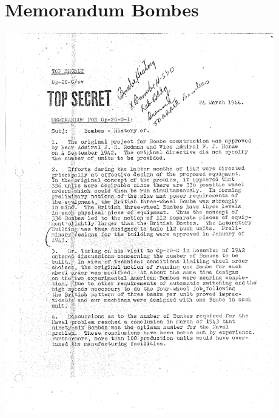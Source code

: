 \documentclass[%
<<<<<<< Updated upstream
11pt,%
twoside,%
titlepage,%
german,%
headsepline%
]{scrartcl}
\begin{document}
\clearpage

\appendix

\section{Memorandum Bombes}
\includegraphics[width=0.88\textwidth,page=1]{pictures/memorandumbombes.pdf}
\end{document}
